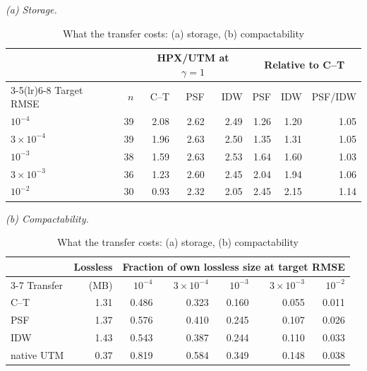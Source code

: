 \begin{table}[t]
\centering
\caption{What the transfer costs: (a) storage, (b) compactability}
\label{tab:transfer}
\footnotesize
\setlength{\tabcolsep}{4pt}
\emph{(a) Storage.}\\[2pt]
\begin{tabular}{@{}lrrrrrrr@{}}
\toprule
 & & \multicolumn{3}{c}{HPX/UTM at $\gamma=1$} & \multicolumn{3}{c}{Relative to C--T} \\
\cmidrule(lr){3-5}\cmidrule(lr){6-8}
Target RMSE & $n$ & C--T & PSF & IDW & PSF & IDW & PSF/IDW \\
\midrule
$10^{-4}$ & 39 & 2.08 & 2.62 & 2.49 & 1.26 & 1.20 & 1.05 \\
$3\times10^{-4}$ & 39 & 1.96 & 2.63 & 2.50 & 1.35 & 1.31 & 1.05 \\
$10^{-3}$ & 38 & 1.59 & 2.63 & 2.53 & 1.64 & 1.60 & 1.03 \\
$3\times10^{-3}$ & 36 & 1.23 & 2.60 & 2.45 & 2.04 & 1.94 & 1.06 \\
$10^{-2}$ & 30 & 0.93 & 2.32 & 2.05 & 2.45 & 2.15 & 1.14 \\
\bottomrule
\end{tabular}
\vspace{4pt}

\emph{(b) Compactability.}\\[2pt]
\begin{tabular}{@{}lrrrrrr@{}}
\toprule
 & Lossless & \multicolumn{5}{c}{Fraction of own lossless size at target RMSE} \\
\cmidrule(lr){3-7}
Transfer & (MB) & $10^{-4}$ & $3\times10^{-4}$ & $10^{-3}$ & $3\times10^{-3}$ & $10^{-2}$ \\
\midrule
C--T & 1.31 & 0.486 & 0.323 & 0.160 & 0.055 & 0.011 \\
PSF & 1.37 & 0.576 & 0.410 & 0.245 & 0.107 & 0.026 \\
IDW & 1.43 & 0.543 & 0.387 & 0.244 & 0.110 & 0.033 \\
native UTM & 0.37 & 0.819 & 0.584 & 0.349 & 0.148 & 0.038 \\
\bottomrule
\end{tabular}
\end{table}
